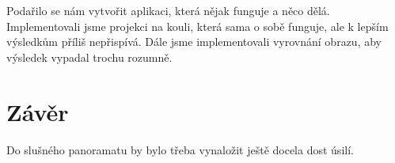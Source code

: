 \documentclass[12pt,a4paper,titlepage,final]{article}
\begin{document}
Podařilo se nám vytvořit aplikaci, která nějak funguje a něco dělá.
Implementovali jsme projekci na kouli, která sama o sobě funguje, ale k lepším
výsledkům příliš nepřispívá. Dále jsme implementovali vyrovnání obrazu, aby 
výsledek vypadal trochu rozumně.

\section{Závěr}

Do slušného panoramatu by bylo třeba vynaložit ještě docela dost úsilí.


%
%

\end{document}
